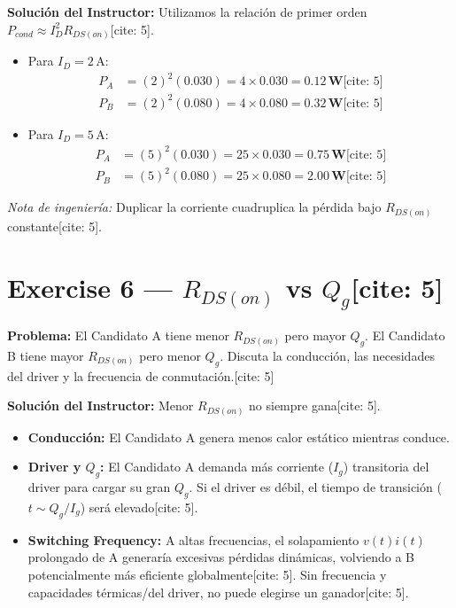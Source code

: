 \documentclass[11pt, a4paper]{article}
\begin{document}
\vspace{0.2cm}
\textbf{Solución del Instructor:}
Utilizamos la relación de primer orden $P_{cond} \approx I_D^2 R_{DS(on)}$[cite: 5].
\begin{itemize}
    \item Para $I_D = 2\,\text{A}$:
    \begin{align*}
        P_A &= (2)^2 (0.030) = 4 \times 0.030 = \mathbf{0.12\,\text{W}} \text{[cite: 5]} \\
        P_B &= (2)^2 (0.080) = 4 \times 0.080 = \mathbf{0.32\,\text{W}} \text{[cite: 5]}
    \end{align*}
    \item Para $I_D = 5\,\text{A}$:
    \begin{align*}
        P_A &= (5)^2 (0.030) = 25 \times 0.030 = \mathbf{0.75\,\text{W}} \text{[cite: 5]} \\
        P_B &= (5)^2 (0.080) = 25 \times 0.080 = \mathbf{2.00\,\text{W}} \text{[cite: 5]}
    \end{align*}
\end{itemize}
\textit{Nota de ingeniería:} Duplicar la corriente cuadruplica la pérdida bajo $R_{DS(on)}$ constante[cite: 5].

\section*{Exercise 6 — $R_{DS(on)}$ vs $Q_g$[cite: 5]}
\textbf{Problema:} El Candidato A tiene menor $R_{DS(on)}$ pero mayor $Q_g$. El Candidato B tiene mayor $R_{DS(on)}$ pero menor $Q_g$. Discuta la conducción, las necesidades del driver y la frecuencia de conmutación.[cite: 5]

\vspace{0.2cm}
\textbf{Solución del Instructor:}
Menor $R_{DS(on)}$ no siempre gana[cite: 5]. 
\begin{itemize}
    \item \textbf{Conducción:} El Candidato A genera menos calor estático mientras conduce.
    \item \textbf{Driver y $Q_g$:} El Candidato A demanda más corriente ($I_g$) transitoria del driver para cargar su gran $Q_g$. Si el driver es débil, el tiempo de transición ($t \sim Q_g / I_g$) será elevado[cite: 5].
    \item \textbf{Switching Frequency:} A altas frecuencias, el solapamiento $v(t)i(t)$ prolongado de A generaría excesivas pérdidas dinámicas, volviendo a B potencialmente más eficiente globalmente[cite: 5]. Sin frecuencia y capacidades térmicas/del driver, no puede elegirse un ganador[cite: 5].
\end{itemize}
\end{document}
